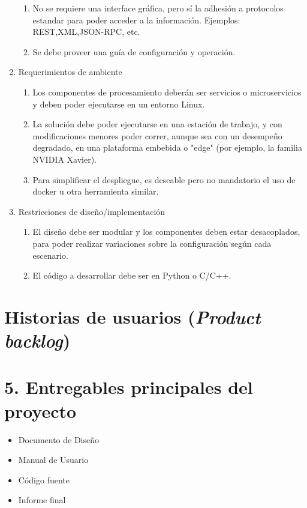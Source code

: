 \documentclass[11pt]{charter}
\begin{document}
\begin{enumerate}
\begin{enumerate}
	\item No se requiere una interface gráfica, pero sí la adhesión a protocolos estandar para poder acceder a la información. Ejemplos: REST,XML,JSON-RPC, etc.
	\item Se debe proveer una guía de configuración y operación.
	\end{enumerate}	
\item Requerimientos de ambiente
	\begin{enumerate}
	\item Los componentes de procesamiento deberán ser servicios o microservicios y deben poder ejecutarse en un entorno Linux.
	\item La solución debe poder ejecutarse en una estación de trabajo, y con modificaciones menores poder correr, aunque sea con un desempeño degradado, en una plataforma embebida o "edge" (por ejemplo, la familia NVIDIA Xavier).
	\item Para simplificar el despliegue, es deseable pero no mandatorio el uso de docker u otra herramienta similar.
	\end{enumerate}		
\item Restricciones de diseño/implementación
	\begin{enumerate}
	\item El diseño debe ser modular y los componentes deben estar desacoplados, para poder realizar variaciones sobre la configuración según cada escenario.
	\item El código a desarrollar debe ser en Python o C/C++.
	\end{enumerate}	
\end{enumerate}

\section{Historias de usuarios (\textit{Product backlog})}
\label{sec:backlog}

\section{5. Entregables principales del proyecto}
\label{sec:entregables}

\begin{itemize}
\item Documento de Diseño
\item Manual de Usuario
\item Código fuente
\item Informe final
\end{itemize}
\end{document}
